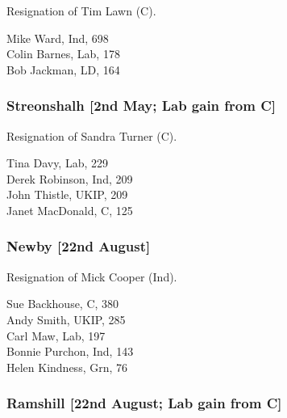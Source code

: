 \documentclass[a4paper,openany,10pt]{book}
\begin{document}

Resignation of Tim Lawn (C).



Mike Ward, Ind, 698\\
Colin Barnes, Lab, 178\\
Bob Jackman, LD, 164\\


\subsubsection*{Streonshalh \hspace*{\fill}\nolinebreak[1]%
\enspace\hspace*{\fill}
[2nd May; Lab gain from C]}


Resignation of Sandra Turner (C).



Tina Davy, Lab, 229\\
Derek Robinson, Ind, 209\\
John Thistle, UKIP, 209\\
Janet MacDonald, C, 125\\


\subsubsection*{Newby \hspace*{\fill}\nolinebreak[1]%
\enspace\hspace*{\fill}
[22nd August]}


Resignation of Mick Cooper (Ind).



Sue Backhouse, C, 380\\
Andy Smith, UKIP, 285\\
Carl Maw, Lab, 197\\
Bonnie Purchon, Ind, 143\\
Helen Kindness, Grn, 76\\


\subsubsection*{Ramshill \hspace*{\fill}\nolinebreak[1]%
\enspace\hspace*{\fill}
[22nd August; Lab gain from C]}
\end{document}
